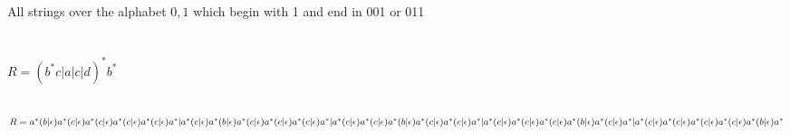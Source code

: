 \documentclass{article}
\begin{document}
  \subsection{}
    All strings over the alphabet $ {0, 1} $ which begin with 1 and end in
    001 or 011
\section{}
  \subsection{}
    $ R = (b^*c | a | c | d)^*b^* $
  \subsection{}
    $ R = a^*(b | \epsilon)a^*(c | \epsilon)a^*(c | \epsilon)a^*(c | \epsilon)a^*(c | \epsilon)a^* %
    \\ | a^*(c | \epsilon)a^*(b | \epsilon)a^*(c | \epsilon)a^*(c | \epsilon)a^*(c | \epsilon)a^* %
    \\ | a^*(c | \epsilon)a^*(c | \epsilon)a^*(b | \epsilon)a^*(c | \epsilon)a^*(c | \epsilon)a^* %
    \\ | a^*(c | \epsilon)a^*(c | \epsilon)a^*(c | \epsilon)a^*(b | \epsilon)a^*(c | \epsilon)a^* %
    \\ | a^*(c | \epsilon)a^*(c | \epsilon)a^*(c | \epsilon)a^*(c | \epsilon)a^*(b | \epsilon)a^* $
\end{document}
